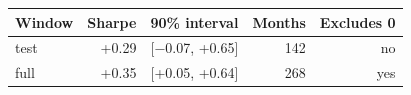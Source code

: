 \begin{tabular}{lrrrr}
\toprule
Window & Sharpe & 90\% interval & Months & Excludes 0 \\
\midrule
test & +0.29 & [$-$0.07, +0.65] & 142 & no \\
full & +0.35 & [+0.05, +0.64] & 268 & yes \\
\bottomrule
\end{tabular}
